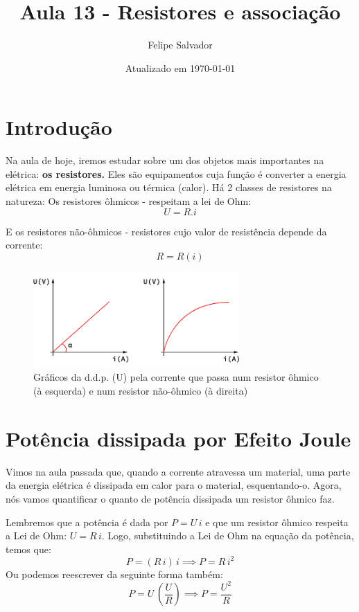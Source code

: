 \documentclass[12pt]{extarticle}
\title{Aula 13 - Resistores e associação}
\author{Felipe Salvador}
\date{Atualizado em \today}
\newcommand{\<}{\langle}
\renewcommand{\>}{\rangle}
\theoremstyle{definition}
\begin{document}
\maketitle

\section{Introdução}
Na aula de hoje, iremos estudar sobre um dos objetos mais importantes na elétrica: \textbf{os resistores.} Eles são equipamentos cuja função é converter a energia elétrica em energia luminosa ou térmica (calor). Há 2 classes de resistores na natureza: Os resistores ôhmicos - respeitam a lei de Ohm:
\begin{equation}
    U=R.i
\end{equation}

E os resistores não-ôhmicos - resistores cujo valor de resistência depende da corrente: 
\begin{equation}
    R = R(i)
\end{equation}

\begin{figure}[H]
    \centering
    \includegraphics[width=0.7\textwidth]{resistor_ohmico.png}
    \caption{Gráficos da d.d.p. (U) pela corrente que passa num resistor ôhmico (à esquerda) e num resistor não-ôhmico (à direita)}
    \label{fig:resistores}
\end{figure}

\section{Potência dissipada por Efeito Joule}
Vimos na aula passada que, quando a corrente atravessa um material, uma parte da energia elétrica é dissipada em calor para o material, esquentando-o. Agora, nós vamos quantificar o quanto de potência dissipada um resistor ôhmico faz.

Lembremos que a potência é dada por $P=U\,i$ e que um resistor ôhmico respeita a Lei de Ohm: $U=R\,i$. Logo, substituindo a Lei de Ohm na equação da potência, temos que:
\begin{equation}\label{eq:power-1}
    P = (R\,i)\,i \implies \boxed{P= R\,i^2}
\end{equation}
Ou podemos reescrever da seguinte forma também:
\begin{equation}
    P = U\,\left(\frac{U}{R}\right) \implies \boxed{P = \frac{U^2}{R}}
\end{equation}
\end{document}
